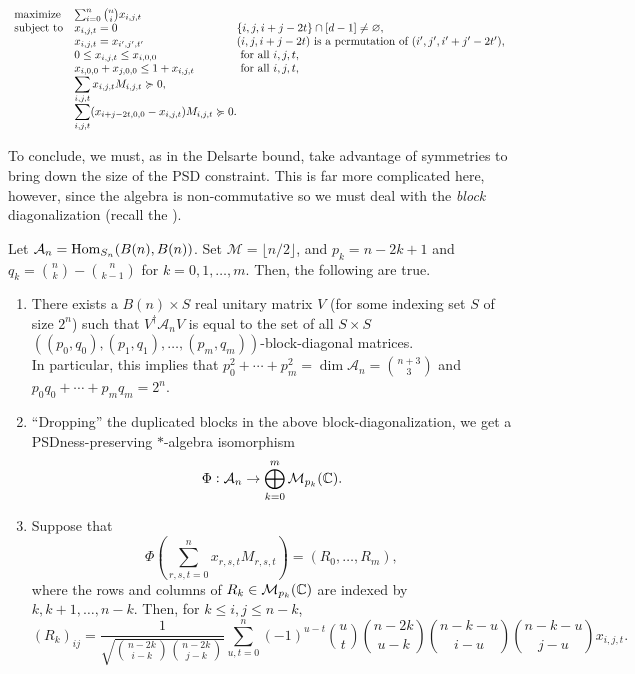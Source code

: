 	\begin{equation}
		\label{indep-sdp2}
		\begin{array}{ll@{}ll}
		\text{maximize}  & \sum_{i=0}^{n} \binom{n}{i} x_{i,j,t}  &\\
		\text{subject to} \displaystyle & x_{i,j,t} = 0 & \{i,j,i+j-2t\} \cap [d-1] \ne \emptyset, \\
		& \displaystyle x_{i,j,t} = x_{i',j',t'} & \text{$(i,j,i+j-2t)$ is a permutation of $(i',j',i'+j'-2t')$}, \\
		& \displaystyle 0 \le x_{i,j,t} \le x_{i,0,0} & \text{ for all $i,j,t$}, \\
		& \displaystyle x_{i,0,0} + x_{j,0,0} \le 1 + x_{i,j,t} & \text{ for all $i,j,t$}, \\
		& \displaystyle \sum_{i,j,t} x_{i,j,t} M_{i,j,t} \pge 0, & \\
		& \displaystyle \sum_{i,j,t} (x_{i+j-2t,0,0} - x_{i,j,t}) M_{i,j,t} \pge 0. &
		\end{array}
	\end{equation}

	To conclude, we must, as in the Delsarte bound, take advantage of symmetries to bring down the size of the PSD constraint. This is far more complicated here, however, since the algebra is non-commutative so we must deal with the \emph{block} diagonalization (recall the ). 

	\begin{ftheo}[Schrijver]
		\label{theo:schrijver}
		Let $\mathcal{A}_n = \operatorname{Hom}_{S_n}(B(n),B(n))$. Set $\mathcal{M} = \lfloor n/2 \rfloor$, and $p_k = n-2k+1$ and $q_k = \binom{n}{k} - \binom{n}{k-1}$ for $k=0,1,\ldots,m$. Then, the following are true.
		\begin{enumerate}[label=(\alph*)]
			\item There exists a $B(n) \times S$ real unitary matrix $V$ (for some indexing set $S$ of size $2^n$) such that $V^\dagger \mathcal{A}_n V$ is equal to the set of all $S \times S$ $((p_0,q_0),(p_1,q_1),\ldots,(p_m,q_m))$-block-diagonal matrices.\\
			In particular, this implies that $p_0^2 + \cdots + p_m^2 = \dim \mathcal{A}_n = \binom{n+3}{3}$ and $p_0q_0 + \cdots + p_mq_m = 2^n$.
			\item ``Dropping'' the duplicated blocks in the above block-diagonalization, we get a PSDness-preserving $*$-algebra isomorphism
			\[ \Phi : \mathcal{A}_n \to \bigoplus_{k=0}^m \mathcal{M}_{p_k}(\mathbb{C}). \]
			\item Suppose that
			\[ \Phi\left( \sum_{r,s,t=0}^n x_{r,s,t} M_{r,s,t} \right) = (R_0,\ldots,R_m), \]
			where the rows and columns of $R_k \in \mathcal{M}_{p_k}(\mathbb{C})$ are indexed by $k,k+1,\ldots,n-k$. Then, for $k \le i,j \le n-k$,
			\[ (R_k)_{ij} = \frac{1}{\sqrt{\binom{n-2k}{i-k}\binom{n-2k}{j-k}}} \sum_{u,t=0}^n (-1)^{u-t} \binom{u}{t} \binom{n-2k}{u-k} \binom{n-k-u}{i-u} \binom{n-k-u}{j-u} x_{i,j,t}. \]
		\end{enumerate}
	\end{ftheo}


